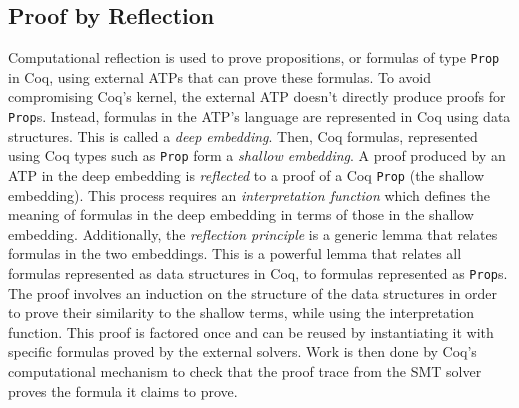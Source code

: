 \documentclass{article}
\begin{document}
	\subsection{Proof by Reflection}
	\label{reflect}
	Computational reflection is used 
	to prove propositions, or formulas 
	of type \texttt{Prop} in Coq,
	using external ATPs that can prove 
	these formulas. To avoid 
	compromising Coq's kernel, the
	external ATP doesn't directly 
	produce proofs for \texttt{Prop}s.
	Instead, formulas in the ATP's 
	language are represented in Coq
	using data structures. This is 
	called a \textit{deep embedding}.
	Then, Coq formulas, represented 
	using Coq types such as 
	\texttt{Prop} form a 
	\textit{shallow embedding}. 
	A proof produced by an ATP in 
	the deep embedding is 
	\textit{reflected} to a proof 
	of a Coq \texttt{Prop} (the 
	shallow embedding). This 
	process requires an 
	\textit{interpretation function}
	which defines the meaning of 
	formulas in the deep embedding in 
	terms of those in the shallow 
	embedding. Additionally, the 
	\textit{reflection principle} is 
	a generic lemma that relates 
	formulas in the two embeddings. 
	This is a powerful lemma that 
	relates all formulas represented
	as data structures in Coq, to 
	formulas represented as 
	\texttt{Prop}s. The proof 
	involves an induction 
	on the structure of the data 
	structures in order to prove 
	their similarity to the shallow 
	terms, while using the
	interpretation function. This 
	proof is factored once and 
	can be reused by instantiating 
	it with specific formulas 
	proved by the external solvers. 
	Work is then done by Coq's 
	computational mechanism to 
	check that the proof trace
	from the SMT solver proves 
	the formula it claims to prove.
	
	


\end{document}

